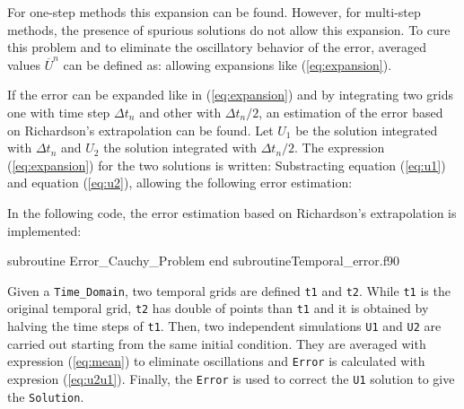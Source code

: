 For one-step methods this expansion can be found. However, for multi-step methods, the presence of spurious solutions do not allow this expansion. 
To cure this problem and to eliminate the oscillatory behavior of the error, averaged values $ \overline{U}^n $ can be defined as:
allowing expansions like (\ref{eq:expansion}).  

If the error can be expanded like in (\ref{eq:expansion}) and by integrating two grids one with time step $ \Delta t_n $ and other with $ \Delta t_n / 2 $, an estimation of the error based on Richardson's extrapolation can be found. 
Let $ U_1 $ be the solution integrated with  $ \Delta t_n $ and $ U_2 $ the solution integrated with $ \Delta t_n /2 $.
The expression (\ref{eq:expansion}) for the two solutions is written:
Substracting equation (\ref{eq:u1}) and equation (\ref{eq:u2}),
allowing the following error estimation: 

In the following code, the error estimation based on Richardson's extrapolation is implemented: 

\vspace{0.5cm} 
             {subroutine Error_Cauchy_Problem}
             {end subroutine}{Temporal_error.f90}  
  
Given a \verb|Time_Domain|, two temporal grids are defined \verb|t1| and \verb|t2|. While \verb|t1| is the original temporal grid, \verb|t2| has double of points than \verb|t1| and it is obtained by halving the time steps of \verb|t1|. 
Then, two independent simulations \verb|U1| and \verb|U2| are carried out starting from the same initial condition. They are averaged with expression (\ref{eq:mean}) to eliminate oscillations and \verb|Error| is calculated with expresion (\ref{eq:u2u1}).
Finally, the \verb|Error| is used to correct the  \verb|U1| solution to give the \verb|Solution|. 

      
  
 
 
